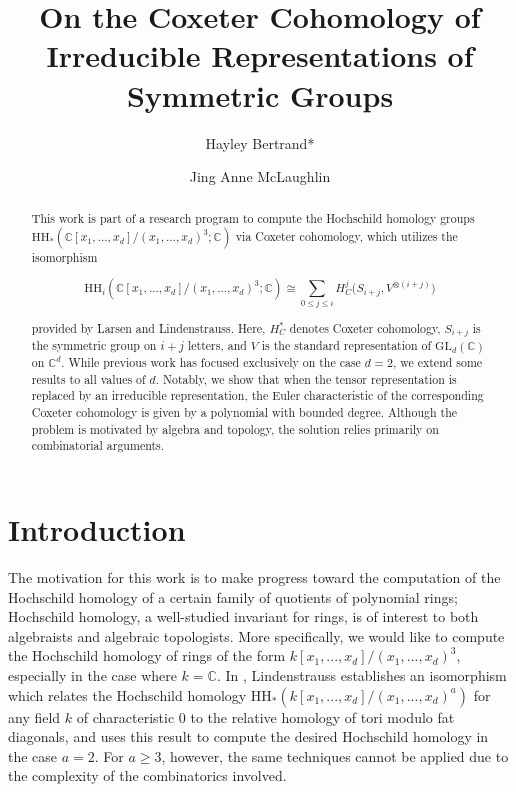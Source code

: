 \documentclass[12pt]{amsart}
\title{On the Coxeter Cohomology of Irreducible Representations of Symmetric Groups}
\author{Hayley Bertrand*}
\author{Jing Anne McLaughlin}
\theoremstyle{definition}
\begin{document}
\begin{abstract}
This work is part of a research program to compute the Hochschild homology groups $\text{HH}_*(\mathbb{C}[x_1, ..., x_d]/(x_1, ..., x_d)^3; \mathbb{C})$ via Coxeter cohomology, which utilizes the isomorphism

\[ \text{HH}_i(\mathbb{C}[x_1, ..., x_d]/(x_1, ..., x_d)^3; \mathbb{C}) \cong \sum_{0 \leq j \leq i} H_C^j\bigg( S_{i+j}, V^{\otimes(i+j)} \bigg)\]

\noindent provided by Larsen and Lindenstrauss. Here, $H^*_C$ denotes Coxeter cohomology, $S_{i+j}$ is the symmetric group on $i+j$ letters, and $V$ is the standard representation of $\text{GL}_d(\mathbb{C})$ on $\mathbb{C}^d$. While previous work has focused exclusively on the case $d=2$, we extend some results to all values of $d$. Notably, we show that when the tensor representation is replaced by an irreducible representation, the Euler characteristic of the corresponding Coxeter cohomology is given by a polynomial with bounded degree. Although the problem is motivated by algebra and topology, the solution relies primarily on combinatorial arguments.

\end{abstract}

\maketitle

\section{Introduction}
\label{intro}
The motivation for this work is to make progress toward the computation of the Hochschild homology of a certain family of quotients of polynomial rings; Hochschild homology, a well-studied invariant for rings, is of interest to both algebraists and algebraic topologists. More specifically, we would like to compute the Hochschild homology of rings of the form $k[x_1, ..., x_d]/(x_1, ..., x_d)^3$, especially in the case where $k = \mathbb{C}$. In \cite{L}, Lindenstrauss establishes an isomorphism which relates the Hochschild homology HH$_*(k[x_1, ..., x_d]/(x_1, ..., x_d)^a)$ for any field $k$ of characteristic 0 to the relative homology of tori modulo fat diagonals, and uses this result to compute the desired Hochschild homology in the case $a=2$. For $a \geq 3$, however, the same techniques cannot be applied due to the complexity of the combinatorics involved. 
\end{document}
